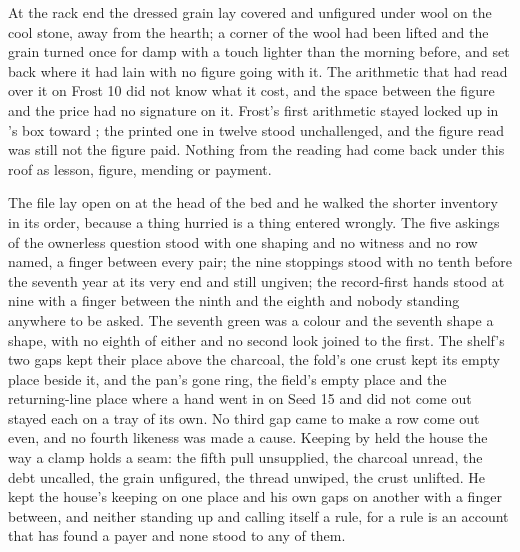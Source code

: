 At the rack end the dressed grain lay covered and unfigured under wool on the cool stone, away from the hearth; a corner of the wool had been lifted and the grain turned once for damp with a touch lighter than the morning before, and set back where it had lain with no figure going with it. The arithmetic that had read over it on Frost 10 did not know what it cost, and the space between the figure and the price had no signature on it. Frost's first arithmetic stayed locked up  in 's box toward ; the printed one in twelve stood unchallenged, and the figure read was still not the figure paid. Nothing from the reading had come back under this roof as lesson, figure, mending or payment.

The file lay open on  at the head of the bed and he walked the shorter inventory in its order, because a thing hurried is a thing entered wrongly. The five askings of the ownerless question stood with one shaping and no witness and no row named, a finger between every pair; the nine stoppings stood with no tenth before the seventh year at its very end and still ungiven; the record-first hands stood at nine with a finger between the ninth and the eighth and nobody standing anywhere to be asked. The seventh green was a colour and the seventh shape a shape, with no eighth of either and no second look joined to the first. The shelf's two gaps kept their place above the charcoal, the fold's one crust kept its empty place beside it, and the pan's gone ring, the field's empty place and the returning-line place where a hand went in on Seed 15 and did not come out stayed each on a tray of its own. No third gap came to make a row come out even, and no fourth likeness was made a cause. Keeping by  held the house the way a clamp holds a seam: the fifth pull unsupplied, the charcoal unread, the debt uncalled, the grain unfigured, the thread unwiped, the crust unlifted. He kept the house's keeping on one place and his own gaps on another with a finger between, and neither standing up and calling itself a rule, for a rule is an account that has found a payer and none stood to any of them.

